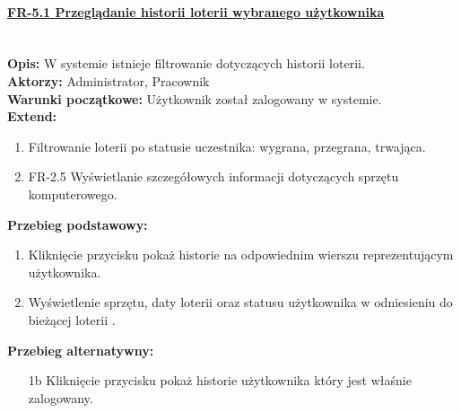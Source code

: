 \paragraph{\underline{FR-5.1 Przeglądanie historii loterii wybranego użytkownika}}\mbox{}\\[1mm]
	\noindent\textbf{Opis:} W systemie istnieje filtrowanie dotyczących historii loterii.\\
	\noindent\textbf{Aktorzy:} Administrator, Pracownik\\
	\textbf{Warunki początkowe:} Użytkownik został zalogowany w systemie.\\
	\textbf{Extend:} 
	\begin{enumerate}[noparskip]
		\item Filtrowanie loterii po statusie uczestnika: wygrana, przegrana, trwająca.
		\item FR-2.5 Wyświetlanie szczegółowych informacji dotyczących sprzętu komputerowego.
	\end{enumerate}
    \textbf{Przebieg podstawowy:}
	\begin{enumerate}[noparskip]
		\item Kliknięcie przycisku pokaż historie na odpowiednim wierszu reprezentującym użytkownika.
		\item Wyświetlenie sprzętu, daty loterii oraz statusu użytkownika w odniesieniu do bieżącej loterii .
    \end{enumerate}
    \textbf{Przebieg alternatywny:}
	\begin{enumerate}[noparskip]
		\item [1b] Kliknięcie przycisku pokaż historie użytkownika który jest właśnie zalogowany.
	\end{enumerate} \mbox{}\\[-11mm]


